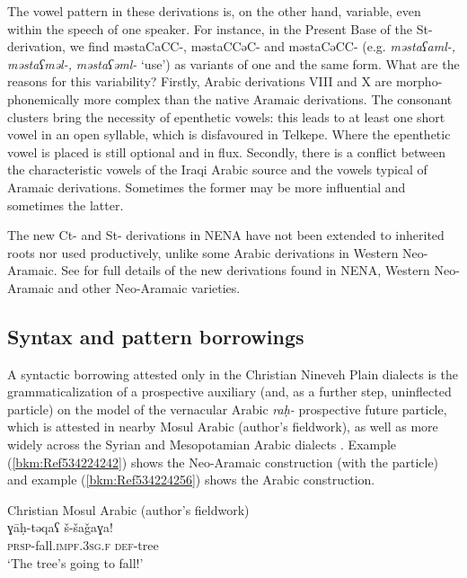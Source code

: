 \documentclass[output=paper]{langsci/langscibook}
\begin{document}
The vowel pattern in these derivations is, on the other hand, variable, even within the speech of one speaker. For instance, in the Present Base of the St-derivation, we find məstaCaCC-, məstaCCəC- and məstaCəCC- (e.g. \textit{məstaʕaml-,} \textit{məstaʕməl-,} \textit{məstaʕəml-} ‘use’) as variants of one and the same form. What are the reasons for this variability? Firstly, Arabic derivations VIII and X are morpho-phonemically more complex than the native Aramaic derivations. The consonant clusters bring the necessity of epenthetic vowels: this leads to at least one short vowel in an open syllable, which is disfavoured in Telkepe. Where the epenthetic vowel is placed is still optional and in flux. Secondly, there is a conflict between the characteristic vowels of the Iraqi Arabic source and the vowels typical of Aramaic derivations. Sometimes the former may be more influential and sometimes the latter.

The new Ct- and St- derivations in NENA have not been extended to inherited roots nor used productively, unlike some Arabic derivations in Western Neo-Aramaic. See \citet{Coghill2015} for full details of the new derivations found in NENA, Western Neo-Aramaic and other Neo-Aramaic varieties.

\subsection{\label{bkm:Ref534214095}Syntax and pattern borrowings}

A syntactic borrowing attested only in the Christian Nineveh Plain dialects is the grammaticalization of a prospective auxiliary (and, as a further step, uninflected particle) on the model of the vernacular Arabic \textit{raḥ-} prospective future particle, which is attested in nearby Mosul Arabic (author’s fieldwork), as well as more widely across the Syrian and Mesopotamian Arabic dialects \citep[304]{Jastrow1978}. Example (\ref{bkm:Ref534224242}) shows the Neo-Aramaic construction (with the particle) and example (\ref{bkm:Ref534224256}) shows the Arabic construction.


\ea\label{bkm:Ref534224256}Christian Mosul Arabic (author’s fieldwork)\\
\gll ɣāḥ-təqaʕ š-šaǧaɣa!\\
     \textsc{prsp-}fall.\textsc{impf.3sg.f} \textsc{def}{}-tree\\
\glt ‘The tree’s going to fall!’\z
\end{document}
